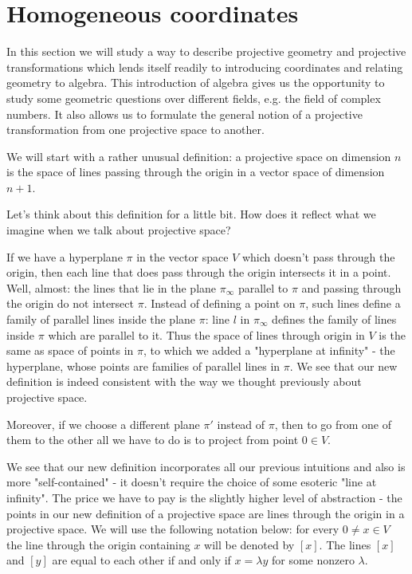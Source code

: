 {{\section{Homogeneous coordinates}

In this section we will study a way to describe projective geometry and projective transformations which lends itself readily to introducing coordinates and relating geometry to algebra. This introduction of algebra gives us the opportunity to study some geometric questions over different fields, e.g. the field of complex numbers. It also allows us to formulate the general notion of a projective transformation from one projective space to another.

We will start with a rather unusual definition: a projective space on dimension $n$ is the space of lines passing through the origin in a vector space of dimension $n+1$.

Let's think about this definition for a little bit. How does it reflect what we imagine when we talk about projective space?

If we have a hyperplane $\pi$ in the vector space $V$ which doesn't pass through the origin, then each line that does pass through the origin intersects it in a point. Well, almost: the lines that lie in the plane $\pi_\infty$ parallel to $\pi$ and passing through the origin do not intersect $\pi$. Instead of defining a point on $\pi$, such lines define a family of parallel lines inside the plane $\pi$: line $l$ in $\pi_\infty$ defines the family of lines inside $\pi$ which are parallel to it. Thus the space of lines through origin in $V$ is the same as space of points in $\pi$, to which we added a "hyperplane at infinity" - the hyperplane, whose points are families of parallel lines in $\pi$. We see that our new definition is indeed consistent with the way we thought previously about projective space.

Moreover, if we choose a different plane $\pi'$ instead of $\pi$, then to go from one of them to the other all we have to do is to project from point $0\in V$.

We see that our new definition incorporates all our previous intuitions and also is more "self-contained" - it doesn't require the choice of some esoteric "line at infinity". The price we have to pay is the slightly higher level of abstraction - the points in our new definition of a projective space are lines through the origin in a projective space. We will use the following notation below: for every $0\neq x\in V$ the line through the origin containing $x$ will be denoted by $[x]$. The lines $[x]$ and $[y]$ are equal to each other if and only if $x=\lambda y$ for some nonzero $\lambda$.

}}
